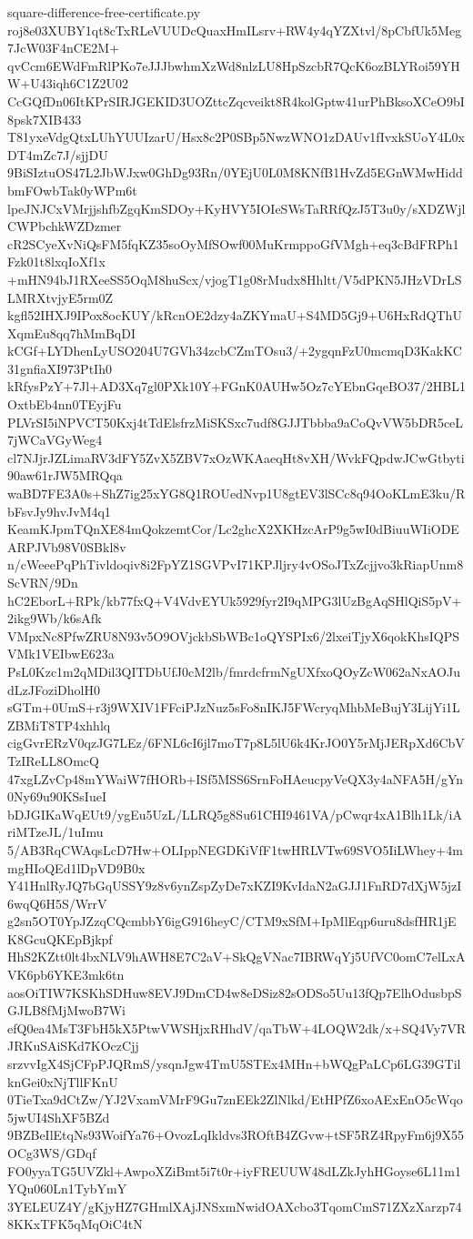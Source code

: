 \documentclass[11pt]{article}
\theoremstyle{definition}
\theoremstyle{remark}
\begin{document}
\begin{filecontents*}[overwrite]{square-difference-free-certificate.py}
roj8e03XUBY1qt8cTxRLeVUUDcQuaxHmILsrv+RW4y4qYZXtvl/8pCbfUk5Meg7JcW03F4nCE2M+
qvCcm6EWdFmRlPKo7eJJJbwhmXzWd8nlzLU8HpSzcbR7QcK6ozBLYRoi59YHW+U43iqh6C1Z2U02
CcGQfDn06ItKPrSIRJGEKID3UOZttcZqcveikt8R4kolGptw41urPhBksoXCeO9bI8psk7XIB433
T81yxeVdgQtxLUhYUUIzarU/Hsx8c2P0SBp5NwzWNO1zDAUv1fIvxkSUoY4L0xDT4mZc7J/sjjDU
9BiSIztuOS47L2JbWJxw0GhDg93Rn/0YEjU0L0M8KNfB1HvZd5EGnWMwHiddbmFOwbTak0yWPm6t
lpeJNJCxVMrjjshfbZgqKmSDOy+KyHVY5IOIeSWsTaRRfQzJ5T3u0y/sXDZWjlCWPbchkWZDzmer
cR2SCyeXvNiQsFM5fqKZ35soOyMfSOwf00MuKrmppoGfVMgh+eq3cBdFRPh1Fzk01t8lxqIoXf1x
+mHN94bJ1RXeeSS5OqM8huScx/vjogT1g08rMudx8Hhltt/V5dPKN5JHzVDrLSLMRXtvjyE5rm0Z
kgfl52IHXJ9IPox8ocKUY/kRcnOE2dzy4aZKYmaU+S4MD5Gj9+U6HxRdQThUXqmEu8qq7hMmBqDI
kCGf+LYDhenLyUSO204U7GVh34zcbCZmTOsu3/+2ygqnFzU0mcmqD3KakKC31gnfiaXI973PtIh0
kRfysPzY+7Jl+AD3Xq7gl0PXk10Y+FGnK0AUHw5Oz7cYEbnGqeBO37/2HBL1OxtbEb4nn0TEyjFu
PLVrSI5iNPVCT50Kxj4tTdElsfrzMiSKSxc7udf8GJJTbbba9aCoQvVW5bDR5ceL7jWCaVGyWeg4
cl7NJjrJZLimaRV3dFY5ZvX5ZBV7xOzWKAaeqHt8vXH/WvkFQpdwJCwGtbyti90aw61rJW5MRQqa
waBD7FE3A0s+ShZ7ig25xYG8Q1ROUedNvp1U8gtEV3lSCc8q94OoKLmE3ku/RbFsvJy9hvJvM4q1
KeamKJpmTQnXE84mQokzemtCor/Lc2ghcX2XKHzcArP9g5wI0dBiuuWIiODEARPJVb98V0SBkl8v
n/cWeeePqPhTivldoqiv8i2FpYZ1SGVPvI71KPJljry4vOSoJTxZcjjvo3kRiapUnm8ScVRN/9Dn
hC2EborL+RPk/kb77fxQ+V4VdvEYUk5929fyr2I9qMPG3lUzBgAqSHlQiS5pV+2ikg9Wb/k6sAfk
VMpxNc8PfwZRU8N93v5O9OVjckbSbWBc1oQYSPIx6/2lxeiTjyX6qokKhsIQPSVMk1VEIbwE623a
PsL0Kzc1m2qMDil3QITDbUfJ0cM2lb/fmrdcfrmNgUXfxoQOyZcW062aNxAOJudLzJFoziDholH0
sGTm+0UmS+r3j9WXIV1FFciPJzNuz5sFo8nIKJ5FWcryqMhbMeBujY3LijYi1LZBMiT8TP4xhhlq
cigGvrERzV0qzJG7LEz/6FNL6cI6jl7moT7p8L5lU6k4KrJO0Y5rMjJERpXd6CbVTzIReLL8OmcQ
47xgLZvCp48mYWaiW7fHORb+ISf5MSS6SrnFoHAeucpyVeQX3y4aNFA5H/gYn0Ny69u90KSsIueI
bDJGIKaWqEUt9/ygEu5UzL/LLRQ5g8Su61CHI9461VA/pCwqr4xA1Blh1Lk/iAriMTzeJL/1uImu
5/AB3RqCWAqsLcD7Hw+OLIppNEGDKiVfF1twHRLVTw69SVO5IiLWhey+4mmgHIoQEd1lDpVD9B0x
Y41HnlRyJQ7bGqUSSY9z8v6ynZspZyDe7xKZI9KvIdaN2aGJJ1FnRD7dXjW5jzI6wqQ6H5S/WrrV
g2sn5OT0YpJZzqCQcmbbY6igG916heyC/CTM9xSfM+IpMlEqp6uru8dsfHR1jEK8GcuQKEpBjkpf
HhS2KZtt0lt4bxNLV9hAWH8E7C2aV+SkQgVNac7IBRWqYj5UfVC0omC7elLxAVK6pb6YKE3mk6tn
aosOiTIW7KSKhSDHuw8EVJ9DmCD4w8eDSiz82sODSo5Uu13fQp7ElhOdusbpSGJLB8fMjMwoB7Wi
efQ0ea4MsT3FbH5kX5PtwVWSHjxRHhdV/qaTbW+4LOQW2dk/x+SQ4Vy7VRJRKuSAiSKd7KOczCjj
srzvvIgX4SjCFpPJQRmS/ysqnJgw4TmU5STEx4MHn+bWQgPaLCp6LG39GTilknGei0xNjTllFKnU
0TieTxa9dCtZw/YJ2VxamVMrF9Gu7znEEk2ZlNlkd/EtHPfZ6xoAExEnO5cWqo5jwUI4ShXF5BZd
9BZBeIlEtqNs93WoifYa76+OvozLqIkldvs3ROftB4ZGvw+tSF5RZ4RpyFm6j9X55OCg3WS/GDqf
FO0yyaTG5UVZkl+AwpoXZiBmt5i7t0r+iyFREUUW48dLZkJyhHGoyse6L11m1YQu060Ln1TybYmY
3YELEUZ4Y/gKjyHZ7GHmlXAjJNSxmNwidOAXcbo3TqomCmS71ZXzXarzp748KKxTFK5qMqOiC4tN

\end{filecontents*}
\end{document}
